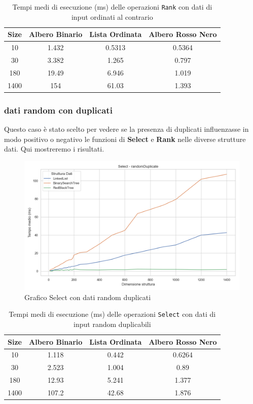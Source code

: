 \documentclass[10pt]{article}
\begin{document}
\begin{table}[H]
\centering
\begin{tabular}{|c|c|c|c|}
\hline
\textbf{Size} & \textbf{Albero Binario} & \textbf{Lista Ordinata} & \textbf{Albero Rosso Nero} \\
\hline
10     & 1.432 & 0.5313 & 0.5364 \\
30     & 3.382 & 1.265  & 0.797 \\
180    & 19.49 & 6.946  & 1.019 \\
1400   & 154 & 61.03  & 1.393 \\
\hline
\end{tabular}
\caption{Tempi medi di esecuzione (ms) delle operazioni \texttt{Rank} con dati di input ordinati al contrario}
\label{tab:confronto-rank-reverse}
\end{table}
\subsubsection{dati random con duplicati}
Questo caso è stato scelto per vedere se la presenza di duplicati influenzasse in modo positivo o negativo le funzioni di \textbf{Select} e \textbf{Rank} nelle diverse strutture dati. Qui mostreremo i risultati.
\begin{figure}[H]
    \centering
    \includegraphics[width=0.8\linewidth]{plots/confronto/randomDuplicate_select.png}
    \caption{Grafico Select con dati random duplicati}
    \label{confronto-select-duplicated}
\end{figure}
\begin{table}[H]
\centering
\begin{tabular}{|c|c|c|c|}
\hline
\textbf{Size} & \textbf{Albero Binario} & \textbf{Lista Ordinata} & \textbf{Albero Rosso Nero} \\
\hline
10     & 1.118 & 0.442 & 0.6264 \\
30     & 2.523 & 1.004  & 0.89 \\
180    & 12.93 & 5.241  & 1.377 \\
1400   & 107.2 & 42.68  & 1.876 \\
\hline
\end{tabular}
\caption{Tempi medi di esecuzione (ms) delle operazioni \texttt{Select} con dati di input random duplicabili}
\label{tab:confronto-select-duplicated}
\end{table}
\end{document}
